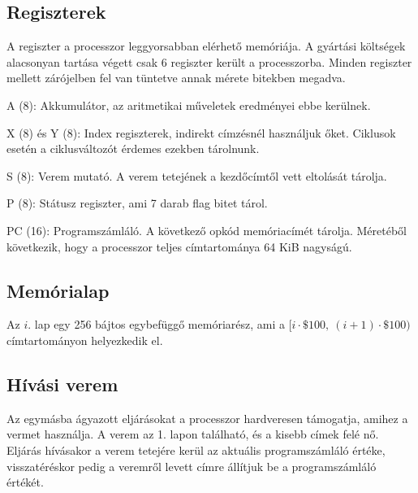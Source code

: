 \subsection{Regiszterek \cite{6502desc}}
A regiszter a processzor leggyorsabban elérhető memóriája.
A gyártási költségek alacsonyan tartása végett csak 6 regiszter került a processzorba.
Minden regiszter mellett zárójelben fel van tüntetve annak mérete bitekben megadva.

\begin{compactdesc}
	\item[A (8):] Akkumulátor, az aritmetikai műveletek eredményei ebbe kerülnek.
	\item[X (8) és Y (8):] 
	Index regiszterek, indirekt címzésnél használjuk őket.
	Ciklusok esetén a ciklusváltozót érdemes ezekben tárolnunk.
	\item[S (8):] 
	Verem mutató. A verem tetejének a kezdőcímtől vett eltolását tárolja.
	\item[P (8):]
	Státusz regiszter, ami 7 darab flag bitet tárol.
	\item[PC (16):]
	Programszámláló. 
	A következő opkód memóriacímét tárolja.
	Méretéből következik, hogy a processzor teljes címtartománya 64 KiB nagyságú.
\end{compactdesc}


\subsection{Memórialap}
Az $i$. lap egy 256 bájtos egybefüggő memóriarész, ami a $ [i \cdot \$100, \: (i+1) \cdot \$100) $ címtartományon helyezkedik el.

\subsection{Hívási verem \cite{6502desc} \cite{6502instr}}
Az egymásba ágyazott eljárásokat a processzor hardveresen támogatja, amihez a vermet használja.
A verem az 1. lapon található, és a kisebb címek felé nő.
Eljárás hívásakor a verem tetejére kerül az aktuális programszámláló értéke, 
visszatéréskor pedig a veremről levett címre állítjuk be a programszámláló értékét.

